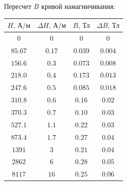 \documentclass[a4paper]{article}
\begin{document}
\begin{enumerate}
Пересчет $B$ кривой намагничивания:
\begin{center}
\begin{tabular}{|c|c|c|c|}\hline
$H\text{, А/м}$&$\Delta H\text{, А/м}$&$B\text{, Тл}$&$\Delta B\text{, Тл}$\\\hline
$0$&$0$&$0$&$0$\\\hline
$85.67$&$0.17$&$0.039$&$0.004$\\\hline
$156.6$&$0.3$&$0.073$&$0.008$\\\hline
$218.0$&$0.4$&$0.173$&$0.013$\\\hline
$247.6$&$0.5$&$0.085$&$0.018$\\\hline
$310.8$&$0.6$&$0.16$&$0.02$\\\hline
$370.3$&$0.7$&$0.10$&$0.03$\\\hline
$527.1$&$1.1$&$0.22$&$0.03$\\\hline
$873.4$&$1.7$&$0.27$&$0.04$\\\hline
$1391$&$3$&$0.21$&$0.04$\\\hline
$2862$&$6$&$0.28$&$0.05$\\\hline
$8117$&$16$&$0.25$&$0.06$\\\hline
\end{tabular}\\~\\
\end{center}





\end{enumerate}
\end{document}
